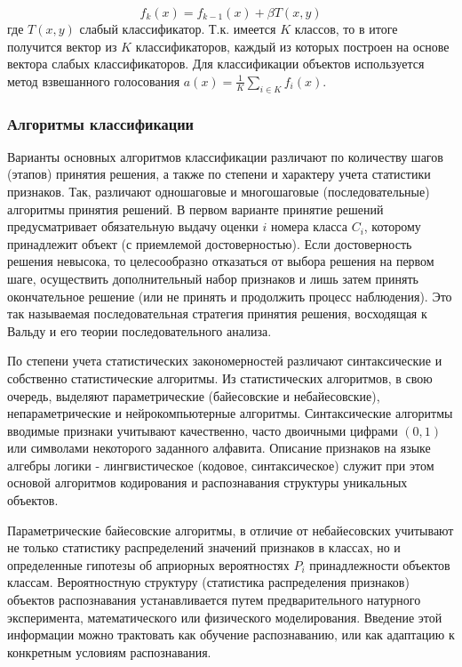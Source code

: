 \begin{equation}
 f_k(x)=f_{k-1}(x)+\beta T(x,y)
\end{equation}
 где $T(x,y)$ слабый классификатор. Т.к. имеется $K$ классов, то в итоге получится вектор из $K$ классификаторов, каждый из которых построен на основе вектора слабых классификаторов. Для классификации объектов используется метод взвешанного голосования $a(x)=\frac{1}{K}\sum_{i \in K}f_i(x)$. 

\subsubsection{Алгоритмы классификации}

Варианты основных алгоритмов классификации различают по количеству шагов (этапов) принятия решения, а также по степени и характеру учета статистики признаков. Так, различают одношаговые и многошаговые (последовательные) алгоритмы принятия решений. В первом варианте принятие решений предусматривает обязательную выдачу оценки $i$ номера класса $C_i$, которому принадлежит объект (с приемлемой достоверностью). Если достоверность решения невысока, то целесообразно отказаться от выбора решения на первом шаге, осуществить дополнительный набор признаков и лишь затем принять окончательное решение (или не принять и продолжить процесс наблюдения). Это так называемая последовательная стратегия принятия решения, восходящая к Вальду и его теории последовательного анализа. 

По степени учета статистических закономерностей различают синтаксические и собственно статистические алгоритмы. Из статистических алгоритмов, в свою очередь, выделяют параметрические (байесовские и небайесовские), непараметрические и нейрокомпьютерные алгоритмы. Синтаксические алгоритмы вводимые признаки учитывают качественно, часто двоичными цифрами $(0,1)$  или символами некоторого заданного алфавита. Описание признаков на языке алгебры логики - лингвистическое (кодовое, синтаксическое) служит при этом основой алгоритмов кодирования и распознавания структуры уникальных объектов. 

Параметрические байесовские алгоритмы, в отличие от небайесовских учитывают не только статистику распределений значений признаков в классах, но и определенные гипотезы об априорных вероятностях $P_i$ принадлежности объектов классам. Вероятностную структуру (статистика распределения признаков) объектов распознавания устанавливается путем предварительного натурного эксперимента, математического или физического моделирования. Введение этой информации можно трактовать как обучение распознаванию, или как адаптацию к конкретным условиям распознавания. 

